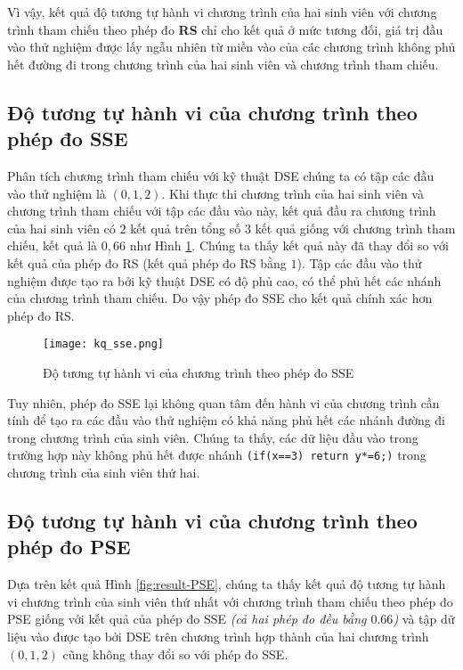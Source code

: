 Vì vậy, kết quả độ tương tự hành vi chương trình của hai sinh viên với chương trình tham chiếu theo phép đo \textbf{RS} chỉ cho kết quả ở mức tương đối, giá trị đầu vào thử nghiệm được lấy ngẫu nhiên từ miền vào của các chương trình không phủ hết đường đi trong chương trình của hai sinh viên và chương trình tham chiếu.

\subsection{Độ tương tự hành vi của chương trình theo phép đo SSE}

Phân tích chương trình tham chiếu với kỹ thuật DSE chúng ta có tập các đầu vào thử nghiệm là $(0, 1, 2)$. Khi thực thi chương trình của hai sinh viên và chương trình tham chiếu với tập các đầu vào này, kết quả đầu ra chương trình của hai sinh viên có $ 2 $ kết quả trên tổng số 3 kết quả giống với chương trình tham chiếu, kết quả là $0,66$ như Hình \ref{fig:results-SSE}. Chúng ta thấy kết quả này đã thay đổi so với kết quả của phép đo RS (kết quả phép đo RS bằng $ 1 $). Tập các đầu vào thử nghiệm được tạo ra bởi kỹ thuật DSE có độ phủ cao, có thể phủ hết các nhánh của chương trình tham chiếu. Do vậy phép đo SSE cho kết quả chính xác hơn phép đo RS.

\begin{figure}[H]
	\caption{Độ tương tự hành vi của chương trình theo phép đo SSE}
	\label{fig:results-SSE}
	\begin{center}
		\texttt{[image: kq\_sse.png]}
	\end{center}
\end{figure}

Tuy nhiên, phép đo SSE lại không quan tâm đến hành vi của chương trình cần tính để tạo ra các đầu vào thử nghiệm có khả năng phủ hết các nhánh đường đi trong chương trình của sinh viên. Chúng ta thấy, các dữ liệu đầu vào trong trường hợp này không phủ hết được nhánh \texttt{(if(x==3) return y*=6;)} trong chương trình của sinh viên thứ hai.

\subsection{Độ tương tự hành vi của chương trình theo phép đo PSE}
Dựa trên kết quả Hình \ref{fig:result-PSE}, chúng ta thấy kết quả độ tương tự hành vi chương trình của sinh viên thứ nhất với chương trình tham chiếu theo phép đo PSE giống với kết quả của phép đo SSE \textit{(cả hai phép đo đều bằng $ 0.66 $)} và tập dữ liệu vào được tạo bởi DSE trên chương trình hợp thành của hai chương trình $ (0, 1, 2) $ cũng không thay đổi so với phép đo SSE.

